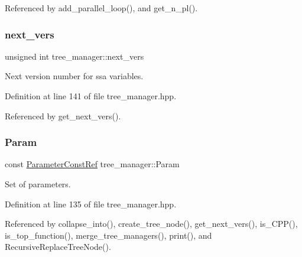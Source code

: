 Referenced by add\+\_\+parallel\+\_\+loop(), and get\+\_\+n\+\_\+pl().

\mbox{\label{classtree__manager_a3cfd3a47f057c1211ef07ef2bc5a755b}} 
\subsubsection{\texorpdfstring{next\+\_\+vers}{next\_vers}}
{\footnotesize\ttfamily unsigned int tree\+\_\+manager\+::next\+\_\+vers\hspace{0.3cm}{\ttfamily [private]}}



Next version number for ssa variables. 



Definition at line 141 of file tree\+\_\+manager.\+hpp.



Referenced by get\+\_\+next\+\_\+vers().

\mbox{\label{classtree__manager_a34d676e5357b95584d95d20e229e6c0e}} 
\subsubsection{\texorpdfstring{Param}{Param}}
{\footnotesize\ttfamily const \hyperlink{Parameter_8hpp_a37841774a6fcb479b597fdf8955eb4ea}{Parameter\+Const\+Ref} tree\+\_\+manager\+::\+Param\hspace{0.3cm}{\ttfamily [private]}}



Set of parameters. 



Definition at line 135 of file tree\+\_\+manager.\+hpp.



Referenced by collapse\+\_\+into(), create\+\_\+tree\+\_\+node(), get\+\_\+next\+\_\+vers(), is\+\_\+\+C\+P\+P(), is\+\_\+top\+\_\+function(), merge\+\_\+tree\+\_\+managers(), print(), and Recursive\+Replace\+Tree\+Node().

\mbox{\label{classtree__manager_a9a63f1945061e6ce166b2339ae876c2a}} 
